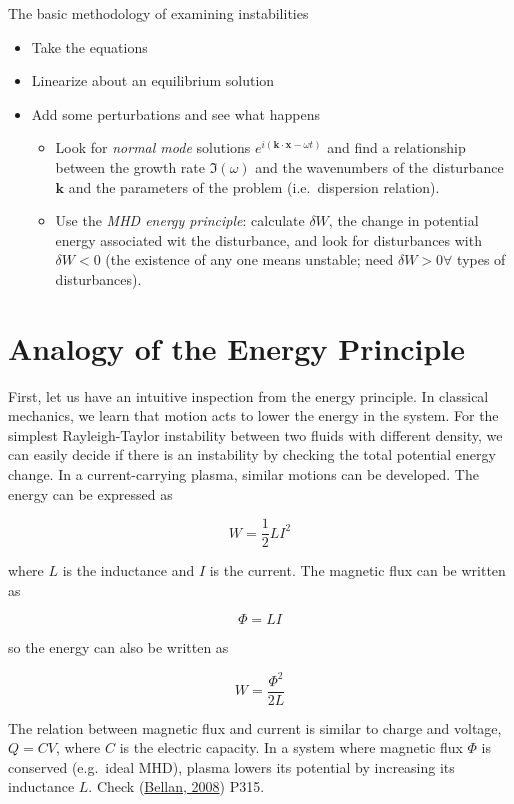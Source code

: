 \documentclass[
  notoc %
]{tufte-book}
\providecommand{\tightlist}{%
  \setlength{\itemsep}{0pt}\setlength{\parskip}{0pt}
}
\begin{document}
The basic methodology of examining instabilities

\begin{itemize}
\tightlist
\item
  Take the equations
\item
  Linearize about an equilibrium solution
\item
  Add some perturbations and see what happens

  \begin{itemize}
  \tightlist
  \item
    Look for \emph{normal mode} solutions
    \(e^{i(\mathbf{k}\cdot\mathbf{x}-\omega t)}\) and find a
    relationship between the growth rate \(\Im(\omega)\) and the
    wavenumbers of the disturbance \(\mathbf{k}\) and the parameters of
    the problem (i.e.~dispersion relation).
  \item
    Use the \emph{MHD energy principle}: calculate \(\delta W\), the
    change in potential energy associated wit the disturbance, and look
    for disturbances with \(\delta W<0\) (the existence of any one means
    unstable; need \(\delta W>0 \forall\) types of disturbances).
  \end{itemize}
\end{itemize}

\hypertarget{analogy-of-the-energy-principle}{%
\section{Analogy of the Energy
Principle}\label{analogy-of-the-energy-principle}}

First, let us have an intuitive inspection from the energy principle. In
classical mechanics, we learn that motion acts to lower the energy in
the system. For the simplest Rayleigh-Taylor instability between two
fluids with different density, we can easily decide if there is an
instability by checking the total potential energy change. In a
current-carrying plasma, similar motions can be developed. The energy
can be expressed as

\[
W=\frac{1}{2}LI^2
\]

where \(L\) is the inductance and \(I\) is the current. The magnetic
flux can be written as

\[
\Phi = LI
\]

so the energy can also be written as

\[
W=\frac{\Phi^2}{2L}
\]

The relation between magnetic flux and current is similar to charge and
voltage, \(Q=CV\), where \(C\) is the electric capacity. In a system
where magnetic flux \(\Phi\) is conserved (e.g.~ideal MHD), plasma
lowers its potential by increasing its inductance \(L\). Check
(\protect\hyperlink{ref-bellan2008fundamentals}{Bellan, 2008}) P315.
\end{document}
